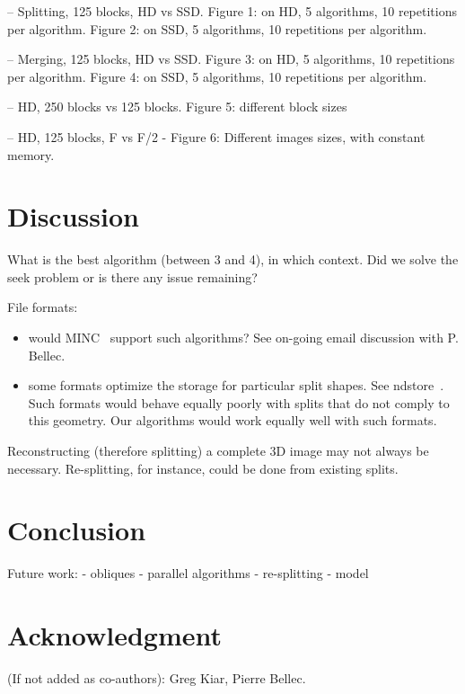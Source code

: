 \documentclass[10pt, conference, compsocconf]{IEEEtran}
\begin{document}
-- Splitting, 125 blocks, HD vs SSD.
Figure 1: on HD, 5 algorithms, 10 repetitions per algorithm.
Figure 2: on SSD, 5 algorithms, 10 repetitions per algorithm. 

-- Merging, 125 blocks, HD vs SSD.
Figure 3: on HD, 5 algorithms, 10 repetitions per algorithm.
Figure 4: on SSD, 5 algorithms, 10 repetitions per algorithm. 

-- HD, 250 blocks vs 125 blocks. 
Figure 5: different block sizes

-- HD, 125 blocks, F vs F/2
- Figure 6: Different images sizes, with constant memory.

\section{Discussion}

What is the best algorithm (between 3 and 4), in which context. Did we
solve the seek problem or is there any issue remaining?

File formats:
\begin{itemize}
\item would MINC~\cite{vincent2016minc} support such algorithms? See on-going email discussion
with P. Bellec.
\item some formats optimize the storage for particular split shapes. See
  ndstore~\cite{burns2013open}. Such formats would behave equally
  poorly with splits that do not comply to this geometry. Our
  algorithms would work equally well with such formats.
\end{itemize}

Reconstructing (therefore splitting) a complete 3D image may not
always be necessary. Re-splitting, for instance, could be done from
existing splits.

\section{Conclusion}

Future work:
- obliques
- parallel algorithms
- re-splitting
- model

\section*{Acknowledgment}

(If not added as co-authors): Greg Kiar, Pierre Bellec.



\end{document}
